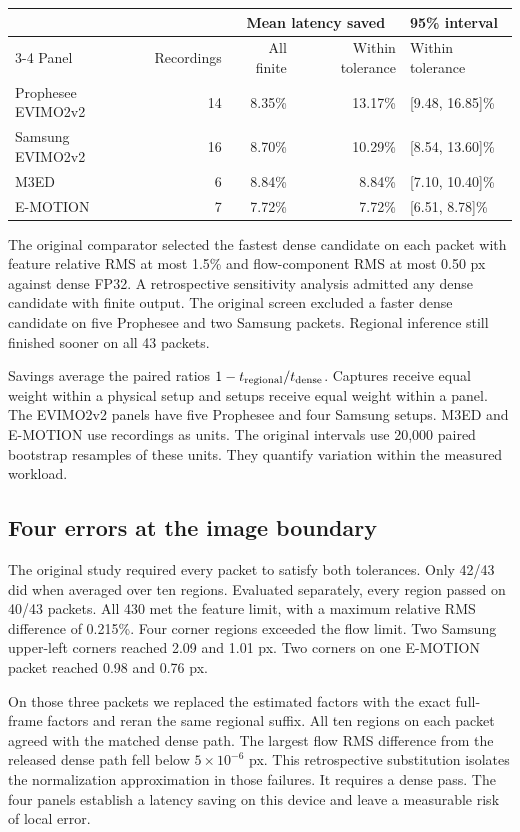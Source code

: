 \documentclass[11pt,letterpaper]{article}
\begin{document}
\begin{center}\small
\begin{tabular}{@{}lrrrl@{}}\toprule
& & \multicolumn{2}{c}{Mean latency saved} & 95\% interval\\
\cmidrule(lr){3-4}
Panel & Recordings & All finite & Within tolerance & Within tolerance\\\midrule
Prophesee EVIMO2v2 & 14 & 8.35\% & 13.17\% & [9.48, 16.85]\%\\
Samsung EVIMO2v2 & 16 & 8.70\% & 10.29\% & [8.54, 13.60]\%\\
M3ED & 6 & 8.84\% & 8.84\% & [7.10, 10.40]\%\\
E-MOTION & 7 & 7.72\% & 7.72\% & [6.51, 8.78]\%\\\bottomrule
\end{tabular}\end{center}
The original comparator selected the fastest dense candidate on each packet with feature relative RMS at most 1.5\% and flow-component RMS at most 0.50 px against dense FP32. A retrospective sensitivity analysis admitted any dense candidate with finite output. The original screen excluded a faster dense candidate on five Prophesee and two Samsung packets. Regional inference still finished sooner on all 43 packets.

Savings average the paired ratios $1-t_{\rm regional}/t_{\rm dense}$. Captures receive equal weight within a physical setup and setups receive equal weight within a panel. The EVIMO2v2 panels have five Prophesee and four Samsung setups. M3ED and E-MOTION use recordings as units. The original intervals use 20,000 paired bootstrap resamples of these units. They quantify variation within the measured workload.

\subsection{Four errors at the image boundary}
The original study required every packet to satisfy both tolerances. Only 42/43 did when averaged over ten regions. Evaluated separately, every region passed on 40/43 packets. All 430 met the feature limit, with a maximum relative RMS difference of 0.215\%. Four corner regions exceeded the flow limit. Two Samsung upper-left corners reached 2.09 and 1.01 px. Two corners on one E-MOTION packet reached 0.98 and 0.76 px.

On those three packets we replaced the estimated factors with the exact full-frame factors and reran the same regional suffix. All ten regions on each packet agreed with the matched dense path. The largest flow RMS difference from the released dense path fell below $5\times10^{-6}$ px. This retrospective substitution isolates the normalization approximation in those failures. It requires a dense pass. The four panels establish a latency saving on this device and leave a measurable risk of local error.
\end{document}
